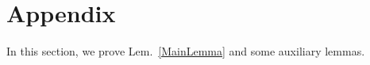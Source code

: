 \documentclass[9pt,twocolumn]{pnas-new}
\newtheorem{lemma}{Lemma}
\renewcommand{\eqref}[1]{\textnormal{[\ref{#1}]}}
\begin{document}
\section{Appendix}\label{proofs}

In this section, we prove Lem.~\ref{MainLemma} and some auxiliary lemmas.  %


\end{document}
